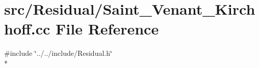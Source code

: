 \section{src/\-Residual/\-Saint\-\_\-\-Venant\-\_\-\-Kirchhoff.cc File Reference}
\label{_saint___venant___kirchhoff_8cc}
{\ttfamily \#include \char`\"{}../../include/\-Residual.\-h\char`\"{}}\\*
